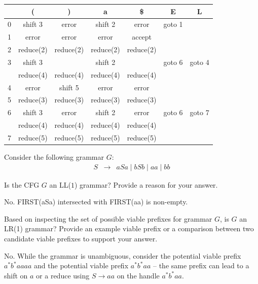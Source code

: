 \documentclass[12pt]{article}
\begin{document}
\begin{exe}
\begin{xlist}
{\begin{soln}
\begin{center}
\begin{tabular}{||l|c|c|c|c||c|c||}
\hline
  & (       & )     & a       & \$    & E      & L \\
\hline
\hline
0 & shift 3 & error & shift 2 & error & goto 1 &     \\
\hline
1 & error   & error & error   & accept &       &     \\
\hline
2 & reduce(2) & reduce(2) & reduce(2)   & reduce(2) &       &      \\
\hline
3 & shift  3 & & shift  2 &  &  goto 6     & goto 4     \\
  & reduce(4) & reduce(4) & reduce(4) & reduce(4) &       &    \\
\hline
4 &  error & shift 5 & error  &  error &       &      \\
\hline
5 & reduce(3) & reduce(3) & reduce(3)   & reduce(3) &       &      \\
\hline
6 & shift 3 & error & shift 2   & error &  goto 6   &  goto 7    \\
  & reduce(4) & reduce(4) & reduce(4) & reduce(4) &       &    \\
\hline
7 & reduce(5)  &reduce(5)  & reduce(5)   & reduce(5) &       &      \\
\hline
\hline
\end{tabular}
\end{center}
\end{soln}
}
\end{xlist}


\newpage

  \ex\label{cfg2}  Consider the following grammar $G$:
  \begin{eqnarray}
    S & \rightarrow & aSa \mid bSb \mid aa \mid bb \nonumber
  \end{eqnarray}
      
  \begin{xlist}
    {\ex Is the CFG $G$ an LL($1$) grammar? Provide a reason for your
    answer.
      \begin{soln}
        No. FIRST(aSa) intersected with FIRST(aa) is non-empty.
      \end{soln}
    }

    {\ex  Based on inspecting the set of possible viable prefixes for
      grammar $G$, is $G$ an LR(1) grammar? Provide an example viable
      prefix or a comparison between two candidate viable prefixes to
      support your answer.
      \begin{soln}
        No. While the grammar is unambiguous, consider the potential
        viable prefix $a^\ast b^\ast a aa a$ and the potential
        viable prefix $a^\ast b^\ast aa$ -- the same prefix can lead
        to a shift on $a$ or a reduce using $S \rightarrow aa$ on
        the handle $a^\ast b^\ast aa$. 
      \end{soln}
    }


\end{xlist}
\end{exe}
\end{document}
